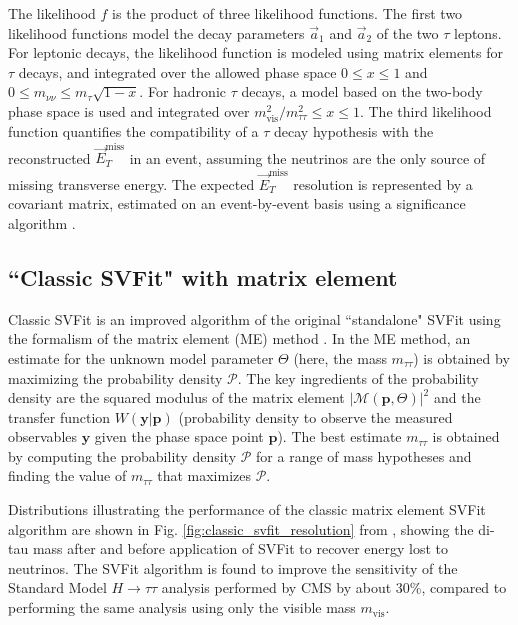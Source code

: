 The likelihood $f$ is the product of three likelihood functions. The first two likelihood functions model the decay parameters $\vec{a}_1$ and $\vec{a}_2$ of the two $\tau$ leptons. For leptonic decays, the likelihood function is modeled using matrix elements for $\tau$ decays, and integrated over the allowed phase space $0 \leq x \leq 1$ and $0 \leq m_{\nu\nu} \leq m_{\tau} \sqrt{1-x}$. For hadronic $\tau$ decays, a model based on the two-body phase space is used and integrated over $m_{\text{vis}}^2/ m_{\tau\tau}^2 \leq x \leq 1$. The third likelihood function quantifies the compatibility of a $\tau$ decay hypothesis with the reconstructed $\vec{E}_{T}^{\text{miss}}$ in an event, assuming the neutrinos are the only source of missing transverse energy. The expected $\vec{E}_{T}^{\text{miss}}$ resolution is represented by a covariant matrix, estimated on an event-by-event basis using a significance algorithm \cite{CMS-JME-10-009}.

\subsection{\texorpdfstring{``Classic SVFit"}{"Classic SVFit} with matrix element}
Classic SVFit is an improved algorithm of the original ``standalone" SVFit using the formalism of the matrix element (ME) method \cite{2014_SVFit_Bianchini}. In the ME method, an estimate for the unknown model parameter $\Theta$ (here, the mass $m_{\tau\tau}$) is obtained by maximizing the probability density $\mathcal{P}$. The key ingredients of the probability density are the squared modulus of the matrix element $|\mathcal{M}(\mathbf{p}, \Theta)|^2$ and the transfer function $W(\mathbf{y}|\mathbf{p})$ (probability density to observe the measured observables $\mathbf{y}$ given the phase space point $\mathbf{p}$). The best estimate $m_{\tau\tau}$ is obtained by computing the probability density $\mathcal{P}$ for a range of mass hypotheses and finding the value of $m_{\tau\tau}$ that maximizes $\mathcal{P}$.

Distributions illustrating the performance of the classic matrix element SVFit algorithm are shown in Fig. \ref{fig:classic_svfit_resolution} from \cite{2014_SVFit_Bianchini}, showing the di-tau mass after and before application of SVFit to recover energy lost to neutrinos. The SVFit algorithm is found to improve the sensitivity of the Standard Model $H \rightarrow \tau\tau$ analysis performed by CMS by about 30\%, compared to performing the same analysis using only the visible mass $m_{\text{vis}}$. 


